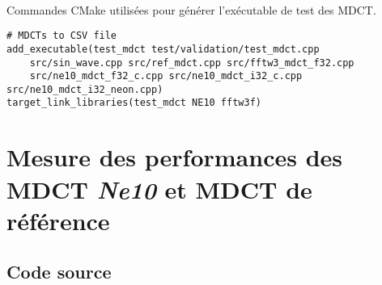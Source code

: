 \documentclass{article}
\begin{document}
\paragraph{}
Commandes CMake utilisées pour générer l'exécutable de test des MDCT.
\lstset{language=make}
\begin{lstlisting}
# MDCTs to CSV file
add_executable(test_mdct test/validation/test_mdct.cpp
    src/sin_wave.cpp src/ref_mdct.cpp src/fftw3_mdct_f32.cpp
    src/ne10_mdct_f32_c.cpp src/ne10_mdct_i32_c.cpp src/ne10_mdct_i32_neon.cpp)
target_link_libraries(test_mdct NE10 fftw3f)
\end{lstlisting}






\newpage
\section{Mesure des performances des MDCT \emph{Ne10} et MDCT de référence}\label{app:perf_mdct_ne10}
\subsection{Code source}\label{app:perf_mdct_ne10_code}
\end{document}
